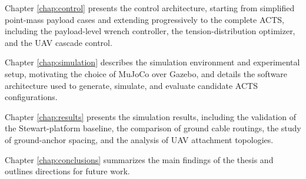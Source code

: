 Chapter \ref{chap:control} presents the control architecture, starting from simplified point-mass payload cases and extending progressively to the complete ACTS, including the payload-level wrench controller, the tension-distribution optimizer, and the UAV cascade control.

Chapter \ref{chap:simulation} describes the simulation environment and experimental setup, motivating the choice of MuJoCo over Gazebo, and details the software architecture used to generate, simulate, and evaluate candidate ACTS configurations.

Chapter \ref{chap:results} presents the simulation results, including the validation of the Stewart-platform baseline, the comparison of ground cable routings, the study of ground-anchor spacing, and the analysis of UAV attachment topologies.

Chapter \ref{chap:conclusions} summarizes the main findings of the thesis and outlines directions for future work.